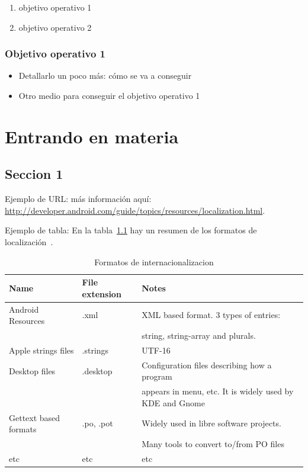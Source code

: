 \documentclass[a4paper, 12pt]{book}
\begin{document}
\begin{enumerate}
 \item objetivo operativo 1

 \item objetivo operativo 2

\end{enumerate}

\subsection{Objetivo operativo 1}
\begin{itemize}
 \item Detallarlo un poco más: cómo se va a conseguir
 \item Otro medio para conseguir el objetivo operativo 1
\end{itemize}


\chapter{Entrando en materia}
\label{chap:materia}

\section{Seccion 1}

Ejemplo de URL: más información aquí: 
\url{http://developer.android.com/guide/topics/resources/localization.html}.

Ejemplo de tabla: En la tabla~\ref{tab:i18nformats} hay un resumen de los formatos
de localización~\cite{GPL}.

\begin{table}[htbp]
\footnotesize
\begin{center}
\begin{tabular}{|l|l|l|}
\hline
\textbf{Name} & \textbf{File extension} & \textbf{Notes} \\ \hline
Android Resources & .xml & XML based format. 3 types of entries: \\
 & & string, string-array and plurals. \\ \hline
Apple strings files & .strings & UTF-16 \\ \hline
Desktop files & .desktop & Configuration files describing how a program \\
 & & appears in menu, etc. It is widely used by KDE and Gnome \\ \hline
Gettext based formats & .po, .pot & Widely used in libre software projects.
\\
 & & Many tools to convert to/from PO files \\ \hline

etc & etc & etc \\ \hline
\end{tabular}
\end{center}
\caption{Formatos de internacionalizacion}
\label{tab:i18nformats}
\end{table}
\end{document}
